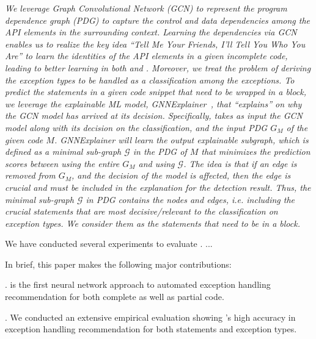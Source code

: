 {\em We leverage Graph Convolutional Network (GCN) to represent the
  program dependence graph (PDG) to capture the control and data
  dependencies among the API elements in the surrounding
  context. Learning the dependencies via GCN enables us to realize the
  key idea {\em ``Tell Me Your Friends, I'll Tell You Who You Are''}
  to learn the identities of the API elements in a given incomplete
  code, leading to better learning in both {\xstate} and
  {\xtype}. Moreover, we treat the problem of deriving the exception
  types to be handled as a classification among the exceptions.
%
To predict the statements in a given code snippet that need to be
wrapped in a  block, we leverage the explainable ML
model, GNNExplainer~\cite{GNNExplainer}, that {\em ``explains'' on why
  the GCN model has arrived at its decision}. Specifically, {\tool}
takes as input the GCN model along with its decision on the
classification, and the input PDG $G_M$ of the given code
$M$. GNNExplainer will learn the output explainable subgraph, which is
defined as a minimal sub-graph $\mathcal{G}$ in the PDG of $M$ that
{\em minimizes the prediction scores between using the entire $G_M$
  and using $\mathcal{G}$}. The idea is that if an edge is {\em
  removed} from $G_M$, and {\em the decision of the model is
  affected, then the edge is crucial and must be included in the
  explanation for the detection result}. Thus, the minimal sub-graph
$\mathcal{G}$ in PDG contains the nodes and edges, {\em i.e.}
including the {\em crucial statements} that are most decisive/relevant
to the classification on exception types. We consider them as the statements
that need to be in a  block.}

We have conducted several experiments to evaluate {\tool}. ...

In brief, this paper makes the following major contributions:

. {\tool} is the first neural network approach to
  automated exception handling recommendation for both complete as
  well as partial code.

. We conducted an extensive
empirical evaluation showing {\tool}'s high accuracy in exception
handling recommendation for both statements and exception types.

  
